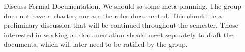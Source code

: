 \documentclass{agenda}
\begin{document}
\begin{agendaitem}{10}{Discuss Formal Documentation.}
    We should so some meta-planning. The group does not have a charter, nor are the roles documented. This should be a preliminary discussion that will be continued throughout the semester. Those interested in working on documentation should meet separately to draft the documents, which will later need to be ratified by the group.
\end{agendaitem}
\end{document}
